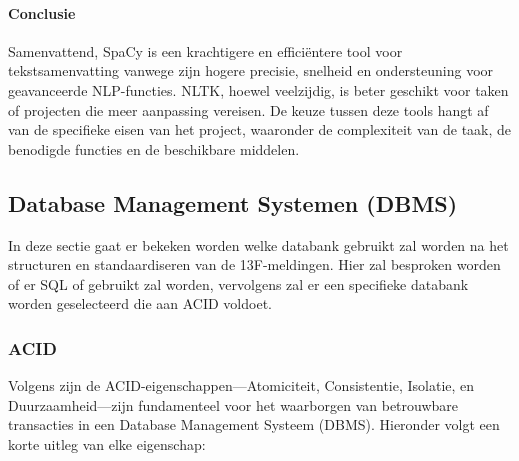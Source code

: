 \paragraph{Conclusie}
Samenvattend, SpaCy is een krachtigere en efficiëntere tool voor tekstsamenvatting vanwege zijn hogere precisie, snelheid en ondersteuning voor geavanceerde NLP-functies. NLTK, hoewel veelzijdig, is beter geschikt voor taken of projecten die meer aanpassing vereisen. De keuze tussen deze tools hangt af van de specifieke eisen van het project, waaronder de complexiteit van de taak, de benodigde functies en de beschikbare middelen.


\subsection{Database Management Systemen (DBMS)}
In deze sectie gaat er bekeken worden welke databank gebruikt zal worden na het structuren en standaardiseren van de 13F-meldingen. Hier zal besproken worden of er SQL of  gebruikt zal worden, vervolgens zal er een specifieke databank worden geselecteerd die aan ACID voldoet.

\subsubsection{ACID}
Volgens \autocite{Kaur2024} zijn de ACID-eigenschappen—Atomiciteit, Consistentie, Isolatie, en Duurzaamheid—zijn fundamenteel voor het waarborgen van betrouwbare transacties in een Database Management Systeem (DBMS). Hieronder volgt een korte uitleg van elke eigenschap:

